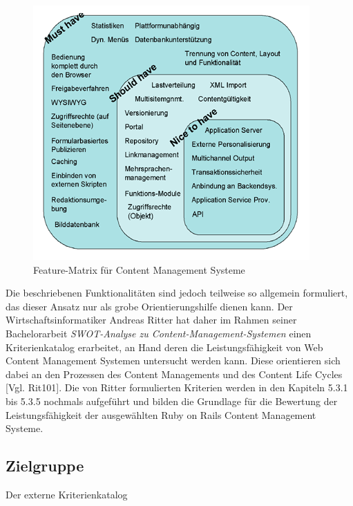 \begin{figure}[!h]
\begin{center}
\includegraphics[scale=0.3]{images/analyse/wcmfeaturematrix.png}
\caption{Feature-Matrix für Content Management Systeme}
\label{featurematrix}
\end{center}
\end{figure}


Die beschriebenen Funktionalitäten sind jedoch teilweise so allgemein formuliert, das dieser Ansatz nur als grobe Orientierungshilfe dienen kann.
Der Wirtschaftsinformatiker Andreas Ritter hat daher im Rahmen seiner Bachelorarbeit \emph{SWOT-Analyse zu Content-Management-Systemen} einen Kriterienkatalog erarbeitet, an Hand deren die Leistungsfähigkeit von Web Content Management Systemen untersucht werden kann. Diese orientieren sich dabei an den Prozessen des Content Managements und des Content Life Cycles [Vgl. Rit101].
\newline
\newline
Die von Ritter formulierten Kriterien werden in den Kapiteln 5.3.1 bis 5.3.5 nochmals aufgeführt und bilden die Grundlage für die Bewertung der Leistungsfähigkeit der ausgewählten Ruby on Rails Content Management Systeme.



\subsection{Zielgruppe}
Der externe Kriterienkatalog


